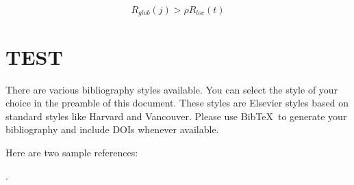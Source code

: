 \documentclass[review]{elsarticle}
\begin{document}
\begin{equation}
	R_{glob}(j) > \rho R_{loc}(t)
\end{equation}

\section{TEST}

There are various bibliography styles available. You can select the style of your choice in the preamble of this document. These styles are Elsevier styles based on standard styles like Harvard and Vancouver. Please use Bib\TeX\ to generate your bibliography and include DOIs whenever available.

Here are two sample references: 

\cite{Evtushenko, Piyavskii1972, Shubert1972, Evtushenko2009, Evtushenko2013, Strongin2000, Sergeyev2013, Pinter1996, Jones2009, Wood1991, Meewella1988, Mladineo1986, Vaz2009, Stripinis2019, Paulavicius2016, Pillo2012, Pillo2016, Barkalov2017_1, Barkalov2017_2, Sergeyev2006, Zilinskas2008, Sovrasov2019}.



\end{document}
